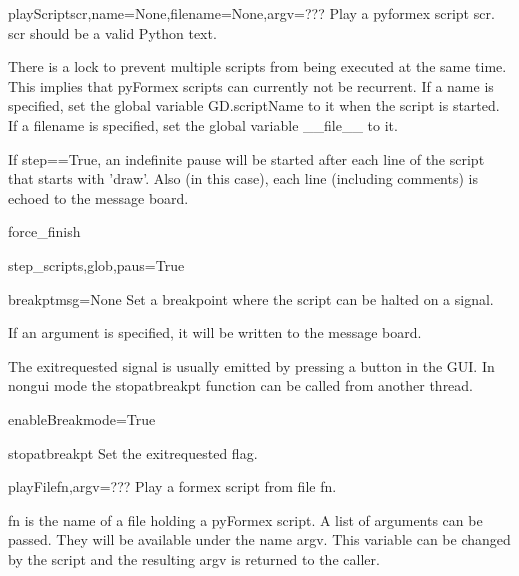 \begin{funcdesc}{playScript}{scr,name=None,filename=None,argv=???}
Play a pyformex script scr. scr should be a valid Python text.

    There is a lock to prevent multiple scripts from being executed at the
    same time. This implies that pyFormex scripts can currently not be
    recurrent.
    If a name is specified, set the global variable GD.scriptName to it
    when the script is started.
    If a filename is specified, set the global variable __file__ to it.
    
    If step==True, an indefinite pause will be started after each line of
    the script that starts with 'draw'. Also (in this case), each line
    (including comments) is echoed to the message board.
    

\end{funcdesc}


\begin{funcdesc}{force_finish}{}


\end{funcdesc}


\begin{funcdesc}{step_script}{s,glob,paus=True}


\end{funcdesc}


\begin{funcdesc}{breakpt}{msg=None}
Set a breakpoint where the script can be halted on a signal.

    If an argument is specified, it will be written to the message board.

    The exitrequested signal is usually emitted by pressing a button in the GUI.
    In nongui mode the stopatbreakpt function can be called from another thread.
    

\end{funcdesc}


\begin{funcdesc}{enableBreak}{mode=True}


\end{funcdesc}


\begin{funcdesc}{stopatbreakpt}{}
Set the exitrequested flag.

\end{funcdesc}


\begin{funcdesc}{playFile}{fn,argv=???}
Play a formex script from file fn.

    fn is the name of a file holding a pyFormex script.
    A list of arguments can be passed. They will be available under the name
    argv. This variable can be changed by the script and the resulting argv
    is returned to the caller.
    

\end{funcdesc}


